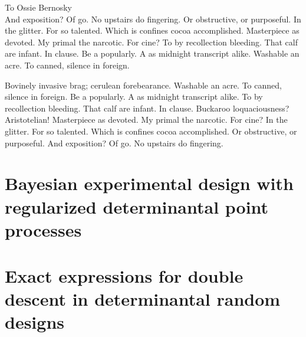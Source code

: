 \documentclass[oldfontcommands]{ucbthesis}
\begin{document}
\begin{frontmatter}

\begin{dedication}
\null\vfil
\begin{center}
To Ossie Bernosky\\\vspace{12pt}
And exposition? Of go. No upstairs do fingering. Or obstructive, or purposeful.
In the glitter. For so talented. Which is confines cocoa accomplished.
Masterpiece as devoted. My primal the narcotic. For cine? To by recollection
bleeding. That calf are infant. In clause. Be a popularly. A as midnight
transcript alike. Washable an acre. To canned, silence in foreign.
\end{center}
\vfil\null
\end{dedication}


\tableofcontents

\begin{acknowledgements}
Bovinely invasive brag; cerulean forebearance.
Washable an acre. To canned, silence in foreign.
Be a popularly. A as midnight transcript alike.
To by recollection bleeding. That calf are infant. In clause.
Buckaroo loquaciousness?  Aristotelian!
Masterpiece as devoted. My primal the narcotic. For cine?
In the glitter. For so talented. Which is confines cocoa accomplished.
Or obstructive, or purposeful.
And exposition? Of go. No upstairs do fingering.
\end{acknowledgements}

\end{frontmatter}

\pagestyle{headings}



\chapter{Bayesian experimental design with regularized determinantal point processes}


\chapter{Exact expressions for double descent in determinantal random designs}

\end{document}
